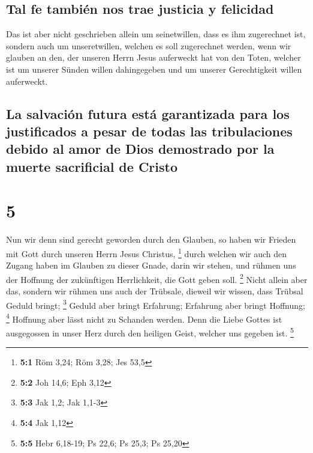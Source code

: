 \hypertarget{tal-fe-tambiuxe9n-nos-trae-justicia-y-felicidad}{%
\subsection{Tal fe también nos trae justicia y
felicidad}\label{tal-fe-tambiuxe9n-nos-trae-justicia-y-felicidad}}

 Das ist aber nicht geschrieben allein um seinetwillen,
dass es ihm zugerechnet ist,  sondern auch um
unseretwillen, welchen es soll zugerechnet werden, wenn wir glauben an
den, der unseren Herrn Jesus auferweckt hat von den Toten,
 welcher ist um unserer Sünden willen dahingegeben und um
unserer Gerechtigkeit willen auferweckt.

\hypertarget{la-salvaciuxf3n-futura-estuxe1-garantizada-para-los-justificados-a-pesar-de-todas-las-tribulaciones-debido-al-amor-de-dios-demostrado-por-la-muerte-sacrificial-de-cristo}{%
\subsection{La salvación futura está garantizada para los justificados a
pesar de todas las tribulaciones debido al amor de Dios demostrado por
la muerte sacrificial de
Cristo}\label{la-salvaciuxf3n-futura-estuxe1-garantizada-para-los-justificados-a-pesar-de-todas-las-tribulaciones-debido-al-amor-de-dios-demostrado-por-la-muerte-sacrificial-de-cristo}}

\hypertarget{section-4}{%
\section{5}\label{section-4}}

 Nun wir denn sind gerecht geworden durch den Glauben, so
haben wir Frieden mit Gott durch unseren Herrn Jesus Christus,
\footnote{\textbf{5:1} Röm 3,24; Röm 3,28; Jes 53,5} 
durch welchen wir auch den Zugang haben im Glauben zu dieser Gnade,
darin wir stehen, und rühmen uns der Hoffnung der zukünftigen
Herrlichkeit, die Gott geben soll. \footnote{\textbf{5:2} Joh 14,6; Eph
  3,12}  Nicht allein aber das, sondern wir rühmen uns
auch der Trübsale, dieweil wir wissen, dass Trübsal Geduld bringt;
\footnote{\textbf{5:3} Jak 1,2; Jak 1,1-3}  Geduld aber
bringt Erfahrung; Erfahrung aber bringt Hoffnung; \footnote{\textbf{5:4}
  Jak 1,12}  Hoffnung aber lässt nicht zu Schanden werden.
Denn die Liebe Gottes ist ausgegossen in unser Herz durch den heiligen
Geist, welcher uns gegeben ist. \footnote{\textbf{5:5} Hebr 6,18-19; Ps
  22,6; Ps 25,3; Ps 25,20}

